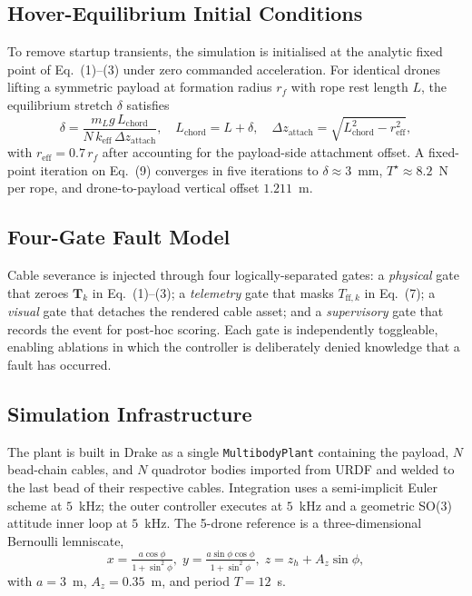 \subsection{Hover-Equilibrium Initial Conditions}
To remove startup transients, the simulation is initialised at the analytic fixed point of Eq.~(1)--(3) under zero commanded acceleration. For identical drones lifting a symmetric payload at formation radius $r_f$ with rope rest length $L$, the equilibrium stretch $\delta$ satisfies
\begin{equation}
\delta = \frac{m_L g\,L_{\mathrm{chord}}}{N\,k_{\mathrm{eff}}\,\Delta z_{\mathrm{attach}}},\quad L_{\mathrm{chord}}=L+\delta,\quad \Delta z_{\mathrm{attach}}=\sqrt{L_{\mathrm{chord}}^2 - r_{\mathrm{eff}}^2},
\end{equation}
with $r_{\mathrm{eff}}=0.7\,r_f$ after accounting for the payload-side attachment offset. A fixed-point iteration on Eq.~(9) converges in five iterations to $\delta\approx 3$~mm, $T^\star\approx 8.2$~N per rope, and drone-to-payload vertical offset $1.211$~m.

\subsection{Four-Gate Fault Model}
Cable severance is injected through four logically-separated gates: a \emph{physical} gate that zeroes $\mathbf{T}_k$ in Eq.~(1)--(3); a \emph{telemetry} gate that masks $T_{\mathrm{ff},k}$ in Eq.~(7); a \emph{visual} gate that detaches the rendered cable asset; and a \emph{supervisory} gate that records the event for post-hoc scoring. Each gate is independently toggleable, enabling ablations in which the controller is deliberately denied knowledge that a fault has occurred.

\subsection{Simulation Infrastructure}
The plant is built in Drake as a single \texttt{MultibodyPlant} containing the payload, $N$ bead-chain cables, and $N$ quadrotor bodies imported from URDF and welded to the last bead of their respective cables. Integration uses a semi-implicit Euler scheme at $5$~kHz; the outer controller executes at $5$~kHz and a geometric SO(3) attitude inner loop at $5$~kHz. The 5-drone reference is a three-dimensional Bernoulli lemniscate,
\begin{equation}
x=\tfrac{a\cos\phi}{1+\sin^2\phi},\;y=\tfrac{a\sin\phi\cos\phi}{1+\sin^2\phi},\;z=z_h+A_z\sin\phi,
\end{equation}
with $a=3$~m, $A_z=0.35$~m, and period $T=12$~s.
